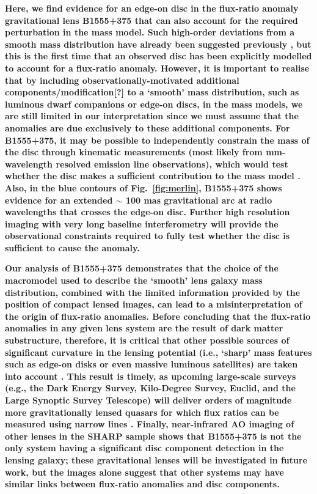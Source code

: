 \documentclass[a4paper,fleqn,usenatbib,useAMS]{mnras}
\begin{document}
\textbf{
Here, we find evidence for an edge-on disc in the flux-ratio
  anomaly gravitational lens B1555+375 that can also account for the
  required perturbation in the mass model. Such high-order deviations
  from a smooth mass distribution have already been suggested
  previously \citep{evans03, congdon05}, but this is the first time
  that an observed disc has been explicitly modelled to account for a
  flux-ratio anomaly. However, it is important to realise that by
  including observationally-motivated additional components/modification[?] to a `smooth' mass
  distribution, such as luminous dwarf companions or edge-on discs, in
  the mass models, we are still limited in our interpretation since we
  must assume that the anomalies are due exclusively to these
  additional components. For B1555+375, it may be possible to independently constrain the mass of the disc 		through kinematic measurements (most likely from mm-wavelength resolved emission line observations), which 	would test whether the disc makes a sufficient contribution to the mass model \citep[e.g. as in the case of 	B1933+503;][]{suyu12}. Also, in the blue contours of Fig.~\ref{fig:merlin}, B1555+375 shows evidence for an extended $\sim$ 100 mas gravitational arc at radio wavelengths that crosses the edge-on disc. Further high resolution imaging with very long baseline interferometry will provide the observational constraints required to fully test whether the disc is sufficient to cause the anomaly.}

\textbf{ Our analysis of B1555+375 demonstrates that the choice of the macromodel used to describe the `smooth' lens galaxy mass distribution, combined with the limited information provided by the position of compact lensed images, can lead to a misinterpretation of the origin of flux-ratio anomalies. Before concluding that the flux-ratio anomalies in any given lens system are the result of dark matter substructure, therefore, it is critical that other possible sources of significant curvature in the lensing potential (i.e., `sharp' mass features such as edge-on disks or even massive luminous satellites) are taken into account 
\citep[e.g.][]{Xu15}. This result is timely, as upcoming large-scale surveys (e.g., the Dark Energy Survey, Kilo-Degree Survey, Euclid, and the Large Synoptic Survey Telescope) will deliver orders of magnitude more gravitationally lensed quasars for which flux ratios can
  be measured using narrow lines \citep[e.g.][]{N14}. Finally, near-infrared AO imaging of other lenses in the SHARP sample shows that B1555+375 is not the only system having a significant disc component detection in the lensing galaxy; these gravitational lenses will be investigated in future work, but the images alone suggest that other systems may have similar links between flux-ratio anomalies and disc components.}
\end{document}

